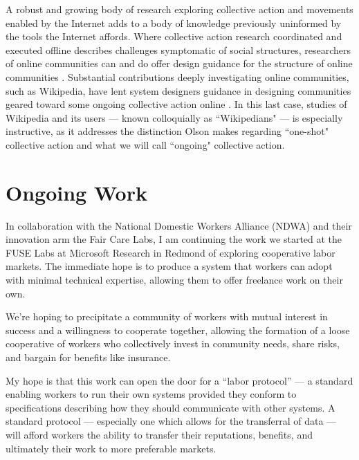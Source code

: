 \documentclass{sigchi-ext}
\begin{document}
A robust and growing body of research exploring collective action and movements enabled by the Internet adds to a body of knowledge previously uninformed by the tools the Internet affords.
Where collective action research coordinated and executed offline describes challenges symptomatic of social structures,
researchers of online communities can and do offer design guidance for the structure of online communities
\cite{Hirsch:2009:FLA:1516016.1516024}.
Substantial contributions deeply investigating online communities, such as Wikipedia, have lent system designers guidance in designing communities geared toward some ongoing collective action online
\cite{Nov:2007:MW:1297797.1297798,wikipediansBornNotMade,whyWikipedians}.
In this last case, studies of Wikipedia and its users
--- known colloquially as ``Wikipedians" ---
is especially instructive, as it addresses the distinction Olson makes regarding ``one-shot" collective action and what we will call ``ongoing" collective action.

\section{Ongoing Work}
In collaboration with
the National Domestic Workers Alliance (NDWA)
and their innovation arm
the Fair Care Labs,
I am continuing the work we started at
the FUSE Labs at Microsoft Research in Redmond
of exploring cooperative labor markets.
The immediate hope is to produce a system
that workers can adopt with minimal technical expertise,
allowing them to offer freelance work on their own.

We're hoping to precipitate a community of workers with
mutual interest in success and a willingness to cooperate together,
allowing the formation of a loose cooperative of workers who collectively
invest in community needs, share risks, and bargain for benefits like insurance.

My hope is that this work can open the door for a ``labor protocol'' ---
a standard enabling workers to run their own systems provided they conform to specifications
describing how they should communicate with other systems.
A standard protocol
--- especially one which allows for the transferral of data ---
will afford workers the ability to transfer their
reputations,
benefits,
and ultimately their work to more preferable markets.

\end{document}
